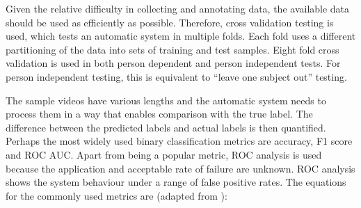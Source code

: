 Given the relative difficulty in collecting and annotating data, the available data should be used as efficiently as possible. Therefore, cross validation testing is used, which tests an automatic system in multiple folds. Each fold uses a different partitioning of the data into sets of training and test samples.
Eight fold cross validation is used in both person dependent and person independent tests. For person independent testing, this is equivalent to ``leave one subject out'' testing. 



The sample videos have various lengths and the automatic system needs to process them in a way that enables comparison with the true label.
The difference between the predicted labels and actual labels is then quantified. Perhaps the most widely used binary classification metrics are accuracy, F1 score and \ac{ROC} \ac{AUC}. Apart from being a popular metric, \ac{ROC} analysis is used because the application and acceptable rate of failure are unknown. \ac{ROC} analysis shows the system behaviour under a range of false positive rates. 
The equations for the commonly used metrics are (adapted from \cite{Sokolova2006}): 

